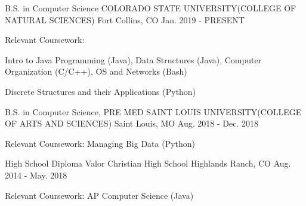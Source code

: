 

\begin{cventries}

  \cventry
    {B.S. in Computer Science} %
    {COLORADO STATE UNIVERSITY(COLLEGE OF NATURAL SCIENCES)} %
    {Fort Collins, CO} %
    {Jan. 2019 - PRESENT} %
    {
      \begin{cvitems} %
        \item {Relevant Coursework:}
        \item {Intro to Java Programming (Java), Data Structures (Java), Computer Organization (C/C++), OS and Networks (Bash)}
        \item {Discrete Structures and their Applications (Python)}
      \end{cvitems}
    }

    \cventry
    {B.S. in Computer Science, PRE MED} %
    {SAINT LOUIS UNIVERSITY(COLLEGE OF ARTS AND SCIENCES)} %
    {Saint Louis, MO} %
    {Aug. 2018 - Dec. 2018} %
    {
      \begin{cvitems} %
        \item {Relevant Coursework: Managing Big Data (Python)}
      \end{cvitems}
    }

    \cventry
    {High School Diploma} %
    {Valor Christian High School} %
    {Highlands Ranch, CO} %
    {Aug. 2014 - May. 2018} %
    {
      \begin{cvitems} %
        \item {Relevant Coursework: AP Computer Science (Java)}
      \end{cvitems}
    }
\end{cventries}
